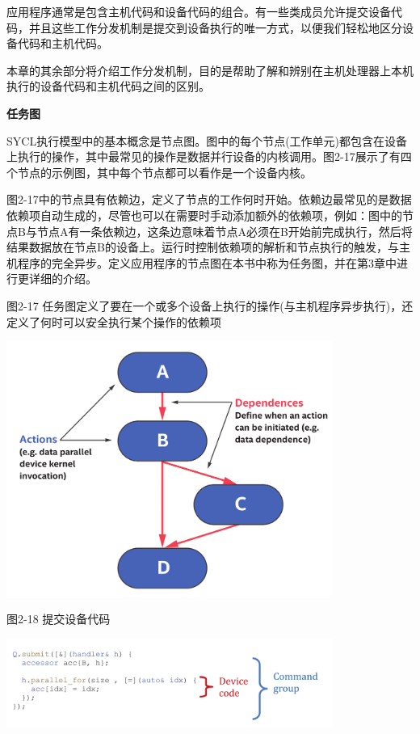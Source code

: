 应用程序通常是包含主机代码和设备代码的组合。有一些类成员允许提交设备代码，并且这些工作分发机制是提交到设备执行的唯一方式，以便我们轻松地区分设备代码和主机代码。\par

本章的其余部分将介绍工作分发机制，目的是帮助了解和辨别在主机处理器上本机执行的设备代码和主机代码之间的区别。\par

\hspace*{\fill} \par %
\textbf{任务图}

SYCL执行模型中的基本概念是节点图。图中的每个节点(工作单元)都包含在设备上执行的操作，其中最常见的操作是数据并行设备的内核调用。图2-17展示了有四个节点的示例图，其中每个节点都可以看作是一个设备内核。\par

图2-17中的节点具有依赖边，定义了节点的工作何时开始。依赖边最常见的是数据依赖项自动生成的，尽管也可以在需要时手动添加额外的依赖项，例如：图中的节点B与节点A有一条依赖边，这条边意味着节点A必须在B开始前完成执行，然后将结果数据放在节点B的设备上。运行时控制依赖项的解析和节点执行的触发，与主机程序的完全异步。定义应用程序的节点图在本书中称为任务图，并在第3章中进行更详细的介绍。\par

\hspace*{\fill} \par %
图2-17 任务图定义了要在一个或多个设备上执行的操作(与主机程序异步执行)，还定义了何时可以安全执行某个操作的依赖项
\begin{center}
	\includegraphics[width=0.8\textwidth]{content/chapter-2/images/10}
\end{center}

\hspace*{\fill} \par %
图2-18 提交设备代码
\begin{center}
	\includegraphics[width=0.8\textwidth]{content/chapter-2/images/11}
\end{center}

